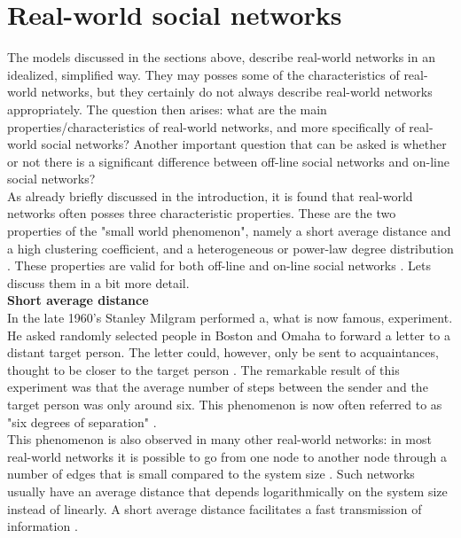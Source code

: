 \documentclass[11 pt , letterpaper , twoside , openright]{book}
\begin{document}


\section{Real-world social networks}
The models discussed in the sections above, describe real-world networks in an idealized, simplified way. They may posses some of the characteristics of real-world networks, but they certainly do not always describe real-world networks appropriately. The question then arises: what are the main properties/characteristics of real-world networks, and more specifically of real-world social networks? Another important question that can be asked is whether or not there is a significant difference between off-line social networks and on-line social networks?\\
\newline
As already briefly discussed in the introduction, it is found that real-world networks often posses three characteristic properties. These are the two properties of the "small world phenomenon", namely a short average distance and a high clustering coefficient, and a heterogeneous or power-law degree distribution \cite{RealWorld}. These properties are valid for both off-line and on-line social networks \cite{Zhang2014}. Lets discuss them in a bit more detail.\\
\newline
\textbf{Short average distance}\\
\newline
In the late 1960's Stanley Milgram performed a, what is now famous, experiment. He asked randomly selected people in Boston and Omaha to forward a letter to a distant target person. The letter could, however, only be sent to acquaintances, thought to be closer to the target person \cite{RealWorld}. The remarkable result of this experiment was that the average number of steps between the sender and the target person was only around six. This phenomenon is now often referred to as "six degrees of separation" \cite{RealWorld}.\\
This phenomenon is also observed in many other real-world networks: in most real-world networks it is possible to go from one node to another node through a number of edges that is small compared to the system size \cite{RealWorld}. Such networks usually have an average distance that depends logarithmically on the system size instead of linearly. A short average distance facilitates a fast transmission of information \cite{Zhang2014}.\\
\end{document}
